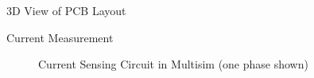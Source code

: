 \begin{frame}{3D View of PCB Layout}
	\begin{figure}
		\centering


	\end{figure}
\end{frame}

\begin{frame}{Current Measurement}
	\begin{figure}
		\centering


		\caption{Current Sensing Circuit in Multisim (one phase shown)}
	\end{figure}
\end{frame}

